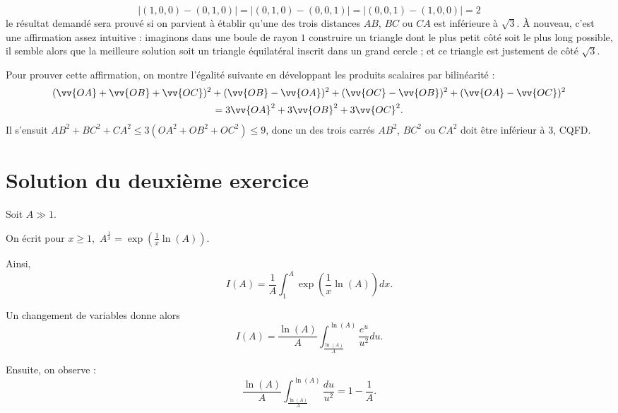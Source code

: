 \begin{enumerate}
\[\lvert(1,0,0) - (0,1,0)\rvert = \lvert(0,1,0) - (0,0,1)\rvert = \lvert(0,0,1) - (1,0,0)\rvert = 2\] le résultat demandé sera prouvé si on parvient à établir qu'une des trois distances $AB$, $BC$ ou $CA$ est inférieure à $\sqrt 3$. À nouveau, c'est une affirmation assez intuitive : imaginons dans une boule de rayon $1$ construire un triangle dont le plus petit côté soit le plus long possible, il semble alors que la meilleure solution soit un triangle équilatéral inscrit dans un grand cercle ; et ce triangle est justement de côté $\sqrt 3$.

\begin{center}
\end{center}
Pour prouver cette affirmation, on montre l'égalité suivante en développant les produits scalaires par bilinéarité :
\begin{multline*}
    (\vv{OA} + \vv{OB} + \vv{OC})^2 + (\vv{OB} - \vv{OA})^2 + (\vv{OC} - \vv{OB})^2 + (\vv{OA} - \vv{OC})^2 \\= 3\vv{OA}^2 + 3 \vv{OB}^2 + 3\vv{OC}^2.
\end{multline*}
Il s'ensuit $AB^2 + BC^2 + CA^2 \leqslant 3(OA^2 + OB^2 + OC^2) \leqslant 9$, donc un des trois carrés $AB^2$, $BC^2$ ou $CA^2$ doit être inférieur à $3$, CQFD.
\end{enumerate}

\section{Solution du deuxième exercice}

Soit $A\gg 1.$

On écrit pour $x\geq 1,$ $\displaystyle A^{\frac{1}{x}}=\exp(\frac{1}{x}\ln(A)).$

Ainsi, $$I(A)=\frac{1}{A}\int_{1}^{A}\exp(\frac{1}{x}\ln(A))dx.$$

Un changement de variables donne alors $$I(A)=\frac{\ln(A)}{A}\int_{\frac{\ln(A)}{A}}^{\ln(A)}\frac{e^{u}}{u^{2}}du.$$

Ensuite, on observe : $$\frac{\ln(A)}{A}\int_{\frac{\ln(A)}{A}}^{\ln(A)}\frac{du}{u^{2}}=1-\frac{1}{A}.$$


